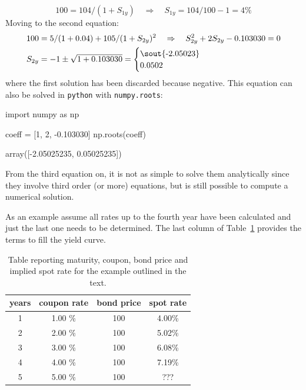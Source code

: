 \begin{equation}
100 = 104 / (1 + S_{1y})\quad\Rightarrow\quad S_{1y} = 104/100 - 1 = 4\%
\end{equation}
Moving to the second equation:
\begin{equation}
\begin{split}
& 100 = 5 / (1 + 0.04) + 105 / (1 + S_{2y})^{2}\quad\Rightarrow\quad S_{2y}^2  + 2 S_{2y}  - 0.103030 = 0 \\
& S_{2y} = - 1 \pm \sqrt{1 + 0.103030} = \begin{cases}\text{\sout{-2.05023}} \\ 0.0502\end{cases}
\end{split}
\end{equation}
where the first solution has been discarded because negative. This equation can also be solved in \texttt{python} with \texttt{numpy.roots}:
\begin{ipython}
import numpy as np

coeff = [1, 2, -0.103030]
np.roots(coeff)
\end{ipython}
\begin{ioutput}
array([-2.05025235,  0.05025235])
\end{ioutput}

From the third equation on, it is not as simple to solve them analytically since they involve third order (or more) equations, but is still possible to compute a numerical solution.

As an example assume all rates up to the fourth year have been calculated and just the last one needs to be determined. The last column of Table~\ref{tab:rates} provides the terms to fill the yield curve.

\begin{table}[htb]
\begin{center}
\begin{tabular}{|c|c|c|c|}
\hline
\textbf{years} & \textbf{coupon rate} & \textbf{bond price} & \textbf{spot rate} \\
\hline
1 & 1.00 \% & 100 & 4.00\% \\
\hline
2 & 2.00 \% & 100 & 5.02\% \\
\hline
3 & 3.00 \% & 100 & 6.08\% \\
\hline
4 & 4.00 \% & 100 & 7.19\% \\
\hline
5 & 5.00 \% & 100 & ??? \\
\hline
\end{tabular}
\end{center}
\caption{Table reporting maturity, coupon, bond price and implied spot rate for the example outlined in the text.}
\label{tab:rates}
\end{table}

